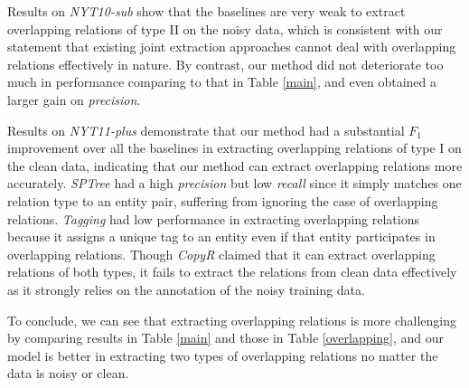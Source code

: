 \documentclass[letterpaper]{article}
\theoremstyle{definition}
\begin{document}
Results on \textit{NYT10-sub} show that the baselines are very weak to extract overlapping relations of type II on the noisy data, which is consistent with our statement that existing joint extraction approaches cannot deal with overlapping relations effectively in nature. By contrast, our method did not deteriorate too much in performance comparing to that in Table \ref{main}, and even obtained a larger gain on \textit{precision}. %


Results on \textit{NYT11-plus} demonstrate that our method had a substantial $F_1$ improvement over all the baselines in extracting overlapping relations of type I on the clean data, indicating that our method can extract overlapping relations more accurately. \textit{SPTree} had a high \textit{precision} but low \textit{recall} since it simply matches one relation type to an entity pair, suffering from ignoring the case of overlapping relations. \textit{Tagging} had low performance in extracting overlapping relations because it assigns a unique tag to an entity even if that entity participates in overlapping relations. Though \textit{CopyR} claimed that it can extract overlapping relations of both types, it fails to extract the relations from clean data effectively as it strongly relies on the annotation of the noisy training data.

To conclude, we can see that extracting overlapping relations is more challenging by comparing results in Table \ref{main} and those in Table \ref{overlapping}, and our model is better in extracting two types of overlapping relations no matter the data is noisy or clean. %
\end{document}
